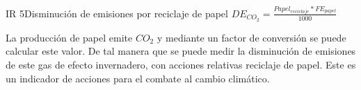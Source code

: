 \begin{indicador}{IR 5}{Disminución de emisiones por reciclaje de papel}
	{$ DE_{CO_2} = \frac{Papel_{reciclaje} * FE_{papel}}{1000}$} 
	{
		La producción de papel emite $CO_2$ y mediante un factor de conversión se puede calcular este valor.
		De tal manera que se puede medir la disminución de emisiones de este gas de efecto invernadero, con acciones relativas reciclaje de papel. Este es un indicador de acciones para el combate  al cambio climático.

	} 	
\end{indicador}
